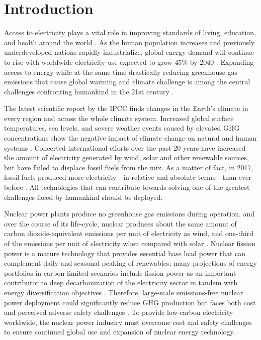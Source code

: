 \chapter{Introduction}
\glsresetall
\label{sec:intro}

Access to electricity plays a vital role in improving standards of living, 
education, and health around the world \cite{petti_future_2018}. 
As the human population increases and previously underdeveloped 
nations rapidly industrialize, global energy demand will continue to rise with 
worldwide electricity use expected to grow $45\%$ by 2040 
\cite{petti_future_2018,noauthor_us_nodate}.
Expanding access to energy while at the same time drastically reducing 
greenhouse gas emissions that cause global warming and climate challenge 
is among the central challenges confronting humankind in the 21st century
\cite{petti_future_2018}. 

The latest scientific report by the \gls{IPCC} finds changes in the Earth's climate 
in every region and across the whole climate system. 
Increased global surface temperatures, sea levels, and severe weather events 
caused by elevated \gls{GHG} concentrations show the negative impact of 
climate change on natural and human systems \cite{noauthor_climate_2018}. 
Concerted international efforts over the past 20 years have increased the amount 
of electricity generated by wind, solar and other renewable sources, but have 
failed to displace fossil fuels from the mix. 
As a matter of fact, in 2017, fossil fuels produced more electricity - in relative 
and absolute terms - than ever before \cite{noauthor_nuclear_nodate}.
All technologies that can contribute towards solving one of the greatest challenges 
faced by humankind should be deployed.

Nuclear power plants produce no greenhouse gas emissions during operation, and over 
the course of its life-cycle, nuclear produces about the same amount of carbon 
dioxide-equivalent emissions per unit of electricity as wind, and one-third of 
the emissions per unit of electricity when compared with solar 
\cite{noauthor_nuclear_nodate-1}.
Nuclear fission power is a mature technology that provides essential base load 
power that can complement daily and seasonal peaking of renewables; many 
projections of energy portfolios in carbon-limited scenarios include fission power as
an important contributor to deep decarbonization of the electricity sector in tandem 
with energy diversification objectives \cite{petti_future_2018,
noauthor_nuclear_nodate-1}.
Therefore, large-scale emissions-free nuclear power deployment could significantly 
reduce \gls{GHG} production but faces both cost and perceived adverse safety 
challenges \cite{noauthor_climate_2018, petti_future_2018}. 
To provide low-carbon electricity worldwide, the nuclear power industry must 
overcome cost and safety challenges to ensure continued global use and 
expansion of nuclear energy technology.

